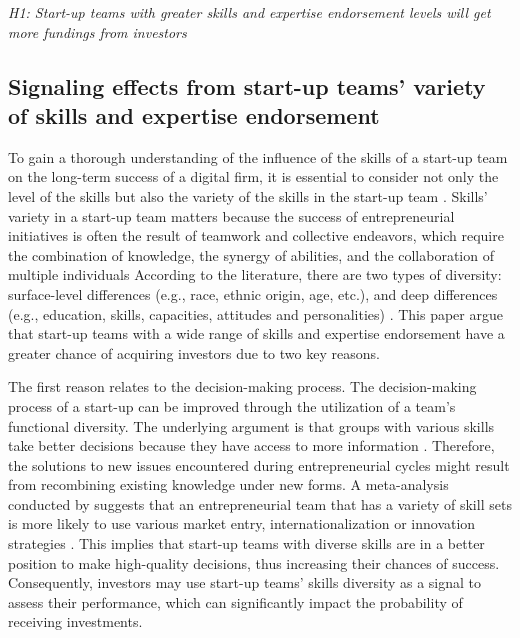 \documentclass[12pt]{article}
\begin{document}
\noindent \textit{H1: Start-up teams with greater skills and expertise endorsement levels will get more fundings from investors}

\subsection{Signaling effects from start-up teams' variety of skills and expertise endorsement}

To gain a thorough understanding of the influence of the skills of a start-up team on the long-term success of a digital firm, it is essential to consider not only the level of the skills but also the variety of the skills in the start-up team \citep{harrison2007s, grillitsch2021does}. Skills' variety in a start-up team matters because the success of entrepreneurial initiatives is often the result of teamwork and collective endeavors, which require the combination of knowledge, the synergy of abilities, and the collaboration of multiple individuals \citep{klotz2014new} According to the literature, there are two types of diversity: surface-level differences (e.g., race, ethnic origin, age, etc.), and deep differences (e.g., education, skills, capacities, attitudes and personalities) \citep{bell2007deep}. This paper argue that start-up teams with a wide range of skills and expertise endorsement have a greater chance of acquiring investors due to two key reasons.

The first reason relates to the decision-making process. The decision-making process of a start-up can be improved through the utilization of a team's functional diversity. The underlying argument is that groups with various skills take better decisions because they have access to more information \citep{hong2001problem}. Therefore, the solutions to new issues encountered during entrepreneurial cycles might result from recombining existing knowledge under new forms. A meta-analysis conducted by \citet{jin2017entrepreneurial} suggests that an entrepreneurial team that has a variety of skill sets is more likely to use various market entry, internationalization or innovation strategies \citep{boeker1989strategic}. This implies that start-up teams with diverse skills are in a better position to make high-quality decisions, thus increasing their chances of success. Consequently, investors may use start-up teams' skills diversity as a signal to assess their performance, which can significantly impact the probability of receiving investments.
\end{document}
